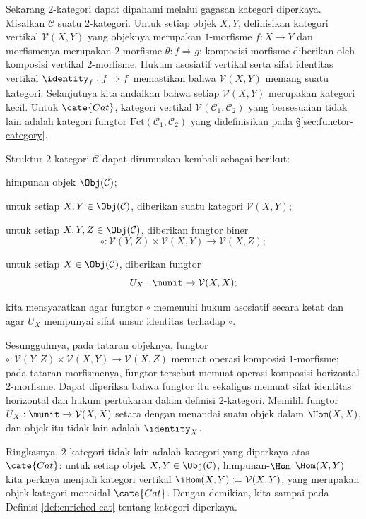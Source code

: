 \begin{remark}
	Sekarang $2$-kategori dapat dipahami melalui gagasan kategori diperkaya. Misalkan $\mathcal{C}$ suatu $2$-kategori. Untuk setiap objek $X, Y$, definisikan kategori vertikal $\mathcal{V}(X, Y)$ yang objeknya merupakan $1$-morfisme $f: X \to Y$ dan morfismenya merupakan $2$-morfisme $\theta: f \Rightarrow g$; komposisi morfisme diberikan oleh komposisi vertikal $2$-morfisme. Hukum asosiatif vertikal serta sifat identitas vertikal $\identity_f: f \Rightarrow f$ memastikan bahwa $\mathcal{V}(X, Y)$ memang suatu kategori. Selanjutnya kita andaikan bahwa setiap $\mathcal{V}(X, Y)$ merupakan kategori kecil. Untuk $\cate{Cat}$, kategori vertikal $\mathcal{V}(\mathcal{C}_1, \mathcal{C}_2)$ yang bersesuaian tidak lain adalah kategori fungtor $\text{Fct}(\mathcal{C}_1, \mathcal{C}_2)$ yang didefinisikan pada \S\ref{sec:functor-category}.

	Struktur $2$-kategori $\mathcal{C}$ dapat dirumuskan kembali sebagai berikut:
	\begin{compactitem}
		\item himpunan objek $\Obj(\mathcal{C})$;
		\item untuk setiap $X, Y \in \Obj(\mathcal{C})$, diberikan suatu kategori $\mathcal{V}(X, Y)$;
		\item untuk setiap $X, Y, Z \in \Obj(\mathcal{C})$, diberikan fungtor biner
			\[ \circ: \mathcal{V}(Y, Z) \times \mathcal{V}(X, Y) \to \mathcal{V}(X, Z); \]
		\item untuk setiap $X \in \Obj(\mathcal{C})$, diberikan fungtor
			\[ U_X: \munit \to \mathcal{V}(X, X); \]
		\item kita mensyaratkan agar fungtor $\circ$ memenuhi hukum asosiatif secara ketat dan agar $U_X$ mempunyai sifat unsur identitas terhadap $\circ$.
	\end{compactitem}
	Sesungguhnya, pada tataran objeknya, fungtor $\circ: \mathcal{V}(Y, Z) \times \mathcal{V}(X, Y) \to \mathcal{V}(X, Z)$ memuat operasi komposisi $1$-morfisme; pada tataran morfismenya, fungtor tersebut memuat operasi komposisi horizontal $2$-morfisme. Dapat diperiksa bahwa fungtor itu sekaligus memuat sifat identitas horizontal dan hukum pertukaran dalam definisi $2$-kategori. Memilih fungtor $U_X: \munit \to \mathcal{V}(X, X)$ setara dengan menandai suatu objek dalam $\Hom(X, X)$, dan objek itu tidak lain adalah $\identity_X$.

	Ringkasnya, $2$-kategori tidak lain adalah kategori yang diperkaya atas $\cate{Cat}$: untuk setiap objek $X, Y \in \Obj(\mathcal{C})$, himpunan-$\Hom$ $\Hom(X, Y)$ kita perkaya menjadi kategori vertikal $\iHom(X, Y) := \mathcal{V}(X, Y)$, yang merupakan objek kategori monoidal $\cate{Cat}$. Dengan demikian, kita sampai pada Definisi \ref{def:enriched-cat} tentang kategori diperkaya.
\end{remark}

